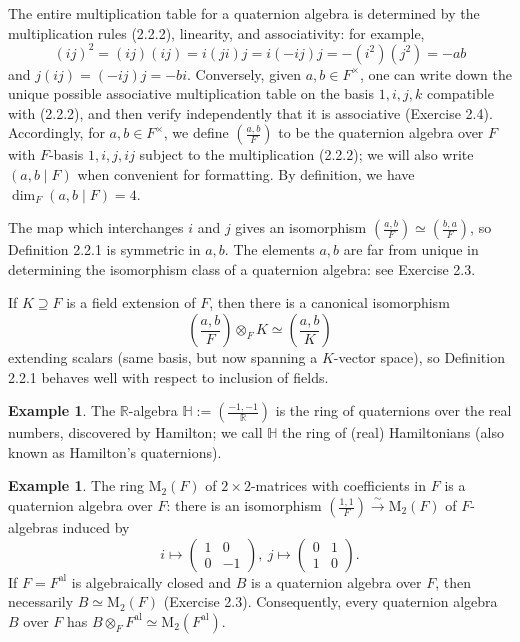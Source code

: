 \documentclass{article}
\theoremstyle{definition}
\newtheorem{example}[theorem]{Example}
\begin{document}
The entire multiplication table for a quaternion algebra is determined by the multiplication rules (2.2.2), linearity, and associativity: for example,
$$(ij)^2 = (ij)(ij) = i(ji)j = i(-ij)j = -(i^2)(j^2) = -ab$$
and $j(ij) = (-ij)j = -bi$. Conversely, given $a, b \in F^\times$, one can write down the unique possible associative multiplication table on the basis $1, i, j, k$ compatible with (2.2.2), and then verify independently that it is associative (Exercise 2.4). Accordingly, for $a, b \in F^\times$, we define $\left(\frac{a, b}{F}\right)$ to be the quaternion algebra over $F$ with $F$-basis $1, i, j, ij$ subject to the multiplication (2.2.2); we will also write $(a, b \mid F)$ when convenient for formatting. By definition, we have $\dim_F (a, b \mid F) = 4$.

The map which interchanges $i$ and $j$ gives an isomorphism $\left(\frac{a, b}{F}\right) \simeq \left(\frac{b, a}{F}\right)$, so Definition 2.2.1 is symmetric in $a, b$. The elements $a, b$ are far from unique in determining the isomorphism class of a quaternion algebra: see Exercise 2.3.

If $K \supseteq F$ is a field extension of $F$, then there is a canonical isomorphism
$$\left(\frac{a, b}{F}\right) \otimes_F K \simeq \left(\frac{a, b}{K}\right)$$
extending scalars (same basis, but now spanning a $K$-vector space), so Definition 2.2.1 behaves well with respect to inclusion of fields.

\begin{example}
The $\mathbb{R}$-algebra $\mathbb{H} := \left(\frac{-1, -1}{\mathbb{R}}\right)$ is the ring of quaternions over the real numbers, discovered by Hamilton; we call $\mathbb{H}$ the ring of (real) Hamiltonians (also known as Hamilton's quaternions).
\end{example}

\begin{example}
The ring $\mathrm{M}_2(F)$ of $2 \times 2$-matrices with coefficients in $F$ is a quaternion algebra over $F$: there is an isomorphism $\left(\frac{1, 1}{F}\right) \xrightarrow{\sim} \mathrm{M}_2(F)$ of $F$-algebras induced by
$$i \mapsto \begin{pmatrix} 1 & 0 \\ 0 & -1 \end{pmatrix}, \ j \mapsto \begin{pmatrix} 0 & 1 \\ 1 & 0 \end{pmatrix}.$$
If $F = F^{\mathrm{al}}$ is algebraically closed and $B$ is a quaternion algebra over $F$, then necessarily $B \simeq \mathrm{M}_2(F)$ (Exercise 2.3). Consequently, every quaternion algebra $B$ over $F$ has $B \otimes_F F^{\mathrm{al}} \simeq \mathrm{M}_2(F^{\mathrm{al}})$.
\end{example}
\end{document}
